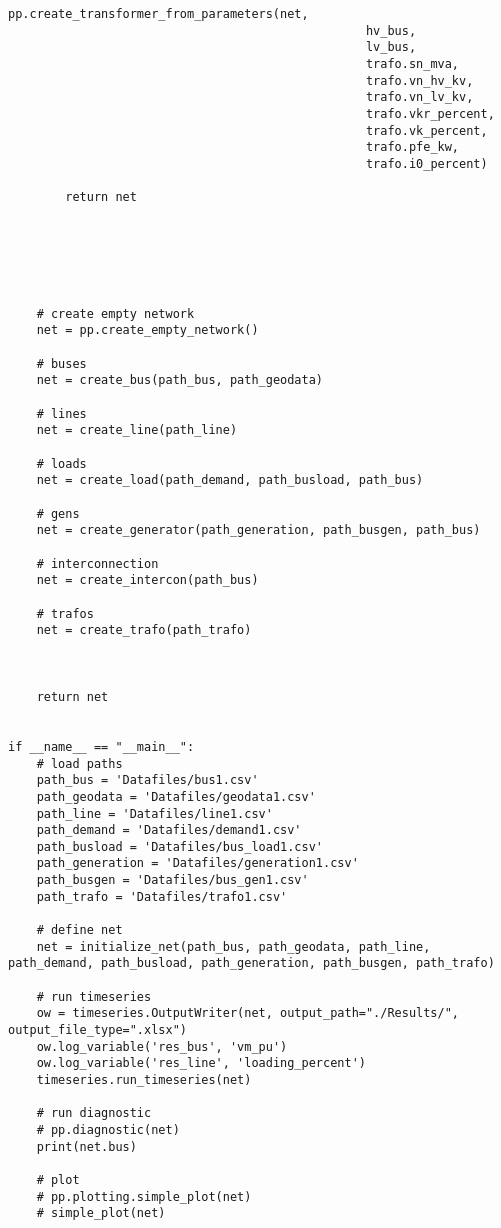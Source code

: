 \begin{lstlisting}[caption={Main code in Python with the Pandapower library}]
            pp.create_transformer_from_parameters(net,
                                                  hv_bus,
                                                  lv_bus,
                                                  trafo.sn_mva,
                                                  trafo.vn_hv_kv,
                                                  trafo.vn_lv_kv,
                                                  trafo.vkr_percent,
                                                  trafo.vk_percent,
                                                  trafo.pfe_kw,
                                                  trafo.i0_percent)

        return net






    # create empty network
    net = pp.create_empty_network()

    # buses
    net = create_bus(path_bus, path_geodata)

    # lines
    net = create_line(path_line)

    # loads
    net = create_load(path_demand, path_busload, path_bus)

    # gens
    net = create_generator(path_generation, path_busgen, path_bus)

    # interconnection
    net = create_intercon(path_bus)

    # trafos
    net = create_trafo(path_trafo)



    return net


if __name__ == "__main__":
    # load paths
    path_bus = 'Datafiles/bus1.csv'
    path_geodata = 'Datafiles/geodata1.csv'
    path_line = 'Datafiles/line1.csv'
    path_demand = 'Datafiles/demand1.csv'
    path_busload = 'Datafiles/bus_load1.csv'
    path_generation = 'Datafiles/generation1.csv'
    path_busgen = 'Datafiles/bus_gen1.csv'
    path_trafo = 'Datafiles/trafo1.csv'

    # define net
    net = initialize_net(path_bus, path_geodata, path_line, path_demand, path_busload, path_generation, path_busgen, path_trafo)

    # run timeseries
    ow = timeseries.OutputWriter(net, output_path="./Results/", output_file_type=".xlsx")
    ow.log_variable('res_bus', 'vm_pu')
    ow.log_variable('res_line', 'loading_percent')
    timeseries.run_timeseries(net)

    # run diagnostic
    # pp.diagnostic(net)
    print(net.bus)

    # plot
    # pp.plotting.simple_plot(net)
    # simple_plot(net)
\end{lstlisting}


